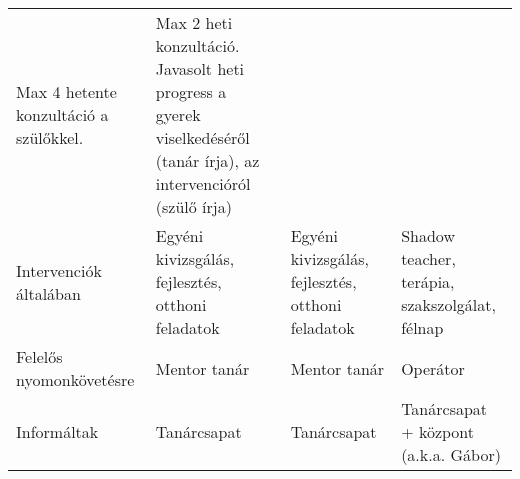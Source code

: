 \begin{longtable}[]{@{}llll@{}}
\begin{minipage}[t]{0.18\columnwidth}
Max 4 hetente konzultáció a szülőkkel.\strut
\end{minipage} & \begin{minipage}[t]{0.43\columnwidth}\raggedright
Max 2 heti konzultáció. Javasolt heti progress a gyerek viselkedéséről
(tanár írja), az intervencióról (szülő írja)\strut
\end{minipage}\tabularnewline
\begin{minipage}[t]{0.09\columnwidth}\raggedright
Intervenciók általában\strut
\end{minipage} & \begin{minipage}[t]{0.19\columnwidth}\raggedright
Egyéni kivizsgálás, fejlesztés, otthoni feladatok\strut
\end{minipage} & \begin{minipage}[t]{0.18\columnwidth}\raggedright
Egyéni kivizsgálás, fejlesztés, otthoni feladatok\strut
\end{minipage} & \begin{minipage}[t]{0.43\columnwidth}\raggedright
Shadow teacher, terápia, szakszolgálat, félnap\strut
\end{minipage}\tabularnewline
\begin{minipage}[t]{0.09\columnwidth}\raggedright
Felelős nyomonkövetésre\strut
\end{minipage} & \begin{minipage}[t]{0.19\columnwidth}\raggedright
Mentor tanár\strut
\end{minipage} & \begin{minipage}[t]{0.18\columnwidth}\raggedright
Mentor tanár\strut
\end{minipage} & \begin{minipage}[t]{0.43\columnwidth}\raggedright
Operátor\strut
\end{minipage}\tabularnewline
\begin{minipage}[t]{0.09\columnwidth}\raggedright
Informáltak\strut
\end{minipage} & \begin{minipage}[t]{0.19\columnwidth}\raggedright
Tanárcsapat\strut
\end{minipage} & \begin{minipage}[t]{0.18\columnwidth}\raggedright
Tanárcsapat\strut
\end{minipage} & \begin{minipage}[t]{0.43\columnwidth}\raggedright
Tanárcsapat + központ (a.k.a. Gábor)\strut
\end{minipage}\tabularnewline
\bottomrule
\end{longtable}

